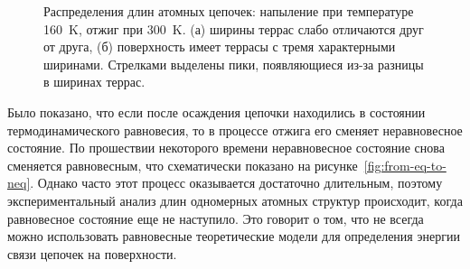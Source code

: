 \documentclass[10pt]{book}
\begin{document}
\begin{figure}
	\centering
	\caption{Распределения длин атомных цепочек: напыление при температуре 160~K, отжиг при 300~K.
		(а) ширины террас слабо отличаются друг от друга,
		(б) поверхность имеет террасы с тремя характерными ширинами.
		Стрелками выделены пики, появляющиеся из-за разницы в ширинах террас.
	}
	\label{fig:our_distributions_2T}
\end{figure}

Было показано, что если после осаждения цепочки находились в состоянии термодинамического равновесия, то в процессе отжига его сменяет неравновесное состояние. По прошествии некоторого времени неравновесное состояние снова сменяется равновесным, что схематически показано
на рисунке~\ref{fig:from-eq-to-neq}. Однако часто этот процесс оказывается достаточно длительным, поэтому экспериментальный анализ длин одномерных атомных структур происходит, когда равновесное состояние еще не наступило. Это говорит о том, что не всегда можно использовать равновесные теоретические модели для определения энергии связи цепочек на поверхности.
\end{document}
